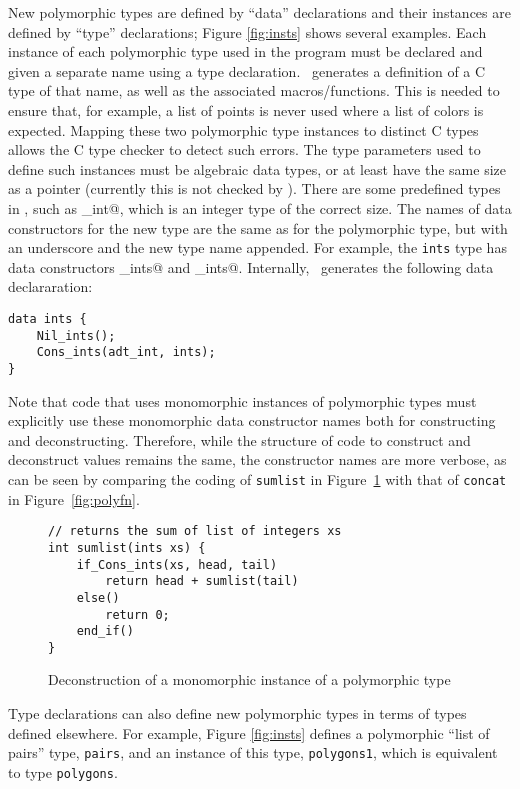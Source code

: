 New polymorphic types are defined by ``data'' declarations and their
instances are defined by ``type'' declarations; Figure \ref{fig:insts}
shows several examples.  Each instance of each polymorphic type used
in the program must be declared and given a separate name using a type
declaration.
\Adtpp\ generates a definition of a C type of that name, as well as the
associated macros/functions.
This is needed to ensure that, for example, a list of points is never
used where a list of colors is expected.  Mapping these
two polymorphic type instances to distinct C types allows
the C type checker to detect such errors.
The type parameters used to define such
instances must be algebraic data types, or at least have
the same size as a pointer (currently this is not checked by \adtpp).
There are some predefined types in \adtpp,
such as \verb@adt_int@, which is an integer type of the correct size.
The names of data constructors for the new type are the same as for
the polymorphic type, but with an underscore and the new type name
appended.  For example, the \texttt{ints} type has data constructors
\verb@Nil_ints@ and \verb@Cons_ints@.
Internally, \adtpp\ generates the following data declararation:
\begin{verbatim}
data ints {
    Nil_ints();
    Cons_ints(adt_int, ints);
}
\end{verbatim}

Note that code that uses monomorphic instances of polymorphic types
must explicitly use these monomorphic data constructor names both for
constructing and deconstructing.
Therefore, while the structure of code to construct and deconstruct
values remains the same, the constructor 
names are more verbose, as can be seen by comparing the coding of
\texttt{sumlist} in Figure~\ref{fig:sumlist} with that of \texttt{concat}
in Figure~\ref{fig:polyfn}.
\begin{figure}[!ht]
\begin{verbatim}
// returns the sum of list of integers xs
int sumlist(ints xs) {
    if_Cons_ints(xs, head, tail)
        return head + sumlist(tail)
    else()
        return 0;
    end_if()
}
\end{verbatim}
\caption{Deconstruction of a monomorphic instance of a polymorphic type}
\label{fig:sumlist}
\end{figure}

Type declarations can also define new polymorphic types in terms of
types defined elsewhere.  For example, Figure \ref{fig:insts}
defines a polymorphic ``list of pairs'' type, \texttt{pairs}, and an
instance of this type, \texttt{polygons1}, which is equivalent to type
\texttt{polygons}.

